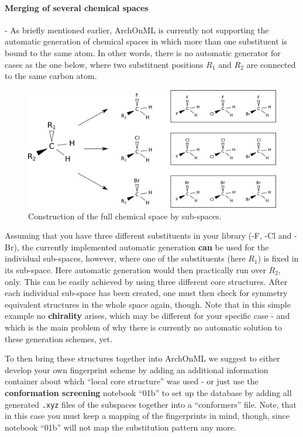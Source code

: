 \documentclass[12pt]{achemso}
\begin{document}
\paragraph{Merging of several chemical spaces} - As briefly mentioned earlier, ArchOnML is currently not supporting the automatic generation of chemical spaces in which more than one substituent is bound to the same atom. In other words, there is no automatic generator for cases as the one below, where two substituent positions $R_1$ and $R_2$ are connected to the same carbon atom.

\begin{figure}
  \centering
   \includegraphics[width=12.5cm]{./resources/05_Merging_Spaces.png}
  \caption{Construction of the full chemical space by sub-spaces.}
  \label{FIG: 05_Merging_Spaces}
\end{figure}


\noindent Assuming that you have three different substituents in your library (-F, -Cl and -Br), the currently implemented automatic generation \textbf{can} be used for the individual sub-spaces, however, where one of the substituents (here $R_1$) is fixed in its sub-space. Here automatic generation would then practically run over $R_2$, only. This can be easily achieved by using three different core structures. After each individual sub-space has been created, one must then check for symmetry equivalent structures in the whole space again, though. Note that in this simple example no \textbf{chirality} arises, which may be different for your specific case - and which is the main problem of why there is currently no automatic solution to these generation schemes, yet.

\noindent To then bring these structures together into ArchOnML we suggest to either develop your own fingerprint scheme by adding an additional information container about which ``local core structure'' was used - or just use the \textbf{conformation screening} notebook ``01b'' to set up the database by adding all generated \texttt{.xyz} files of the subspaces together into a ``conformers'' file. Note, that in this case you must keep a mapping of the fingerprints in mind, though, since notebook ``01b'' will not map the substitution pattern any more.
\end{document}
